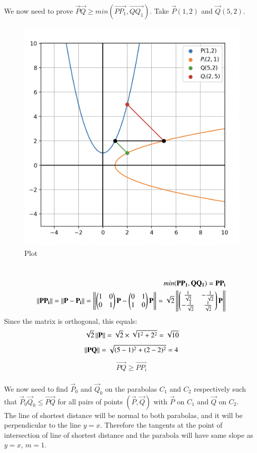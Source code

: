 \documentclass[12pt]{article}
\begin{document}
We now need to prove $\vec{P}\vec{Q} \geq min(\vec{PP_1}, \vec{QQ_1}).$ Take $\vec{P}(1,2)$ and $\vec{Q}(5,2)$.
\begin{figure}[H]
    \centering
    \includegraphics[width=0.5\columnwidth]{Figs/10753.png}
    \caption{Plot}
    \label{fig:placeholder}
\end{figure}\\
\begin{align} min(\mathbf{PP_1}, \mathbf{QQ_1}) = \mathbf{PP_i}\\
\left\lVert\mathbf{PP_i}\right\rVert = \left\lVert\mathbf{P} - \mathbf{P_i} \right\rVert= \left\lVert\begin{pmatrix}1&0\\0&1\end{pmatrix}\mathbf{P} - \begin{pmatrix}0&1\\1&0\end{pmatrix}\mathbf{P}\right\rVert =
\sqrt{2}\left\lVert\begin{pmatrix}\frac{1}{\sqrt{2}} &-\frac{1}{\sqrt{2}} \\ -\frac{1}{\sqrt{2}} & \frac{1}{\sqrt{2}}\end{pmatrix}\mathbf{P}\right\rVert
\end{align}
Since the matrix is orthogonal, this equals:
\begin{align}
\sqrt{2}\left\lVert\mathbf{P}\right\rVert = \sqrt{2}\times \sqrt{1^2 + 2^2} = \sqrt{10}
\end{align}
\begin{align}
    \left\lVert\mathbf{PQ}\right\rVert = \sqrt{(5-1)^2 + (2-2)^2} = 4
\end{align}
\begin{align}\vec{PQ} \geq \vec{PP_i}\end{align}\\
We now need to find $\vec{P}_0$ and $\vec{Q}_0$ on the parabolas $C_1$ and $C_2$ respectively such that $\vec{P}_0\vec{Q}_0 \leq \vec{PQ}$ for all pairs of points $(\vec{P}, \vec{Q})$
with $\vec{P}$ on $C_1$ and $\vec{Q}$ on $C_2$. \vspace{1cm}\\
The line of shortest distance will be normal to both parabolas, and it will be perpendicular to the line $y=x$. Therefore the tangents at the point of intersection of line of shortest distance and the parabola will have same slope as $y=x$, $m=1$.\vspace{1cm}\\
\end{document}
